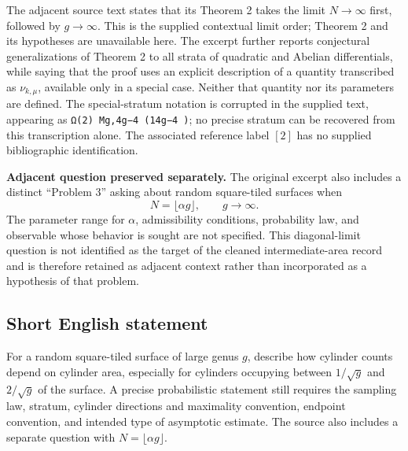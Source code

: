\documentclass[11pt]{article}
\begin{document}
The adjacent source text states that its Theorem 2 takes the limit \(N\to\infty\) first, followed by \(g\to\infty\). This is the supplied contextual limit order; Theorem 2 and its hypotheses are unavailable here. The excerpt further reports conjectural generalizations of Theorem 2 to all strata of quadratic and Abelian differentials, while saying that the proof uses an explicit description of a quantity transcribed as \(\nu_{k,\mu}\), available only in a special case. Neither that quantity nor its parameters are defined. The special-stratum notation is corrupted in the supplied text, appearing as \texttt{Ω(2) Mg,4g−4 (14g−4 )}; no precise stratum can be recovered from this transcription alone. The associated reference label \([2]\) has no supplied bibliographic identification.

\textbf{Adjacent question preserved separately.} The original excerpt also includes a distinct ``Problem 3'' asking about random square-tiled surfaces when
\[
 N=\lfloor\alpha g\rfloor,\qquad g\to\infty.
\]
The parameter range for \(\alpha\), admissibility conditions, probability law, and observable whose behavior is sought are not specified. This diagonal-limit question is not identified as the target of the cleaned intermediate-area record and is therefore retained as adjacent context rather than incorporated as a hypothesis of that problem.
\subsection{Short English statement}
For a random square-tiled surface of large genus \(g\), describe how cylinder counts depend on cylinder area, especially for cylinders occupying between \(1/\sqrt g\) and \(2/\sqrt g\) of the surface. A precise probabilistic statement still requires the sampling law, stratum, cylinder directions and maximality convention, endpoint convention, and intended type of asymptotic estimate. The source also includes a separate question with \(N=\lfloor\alpha g\rfloor\).
\end{document}
